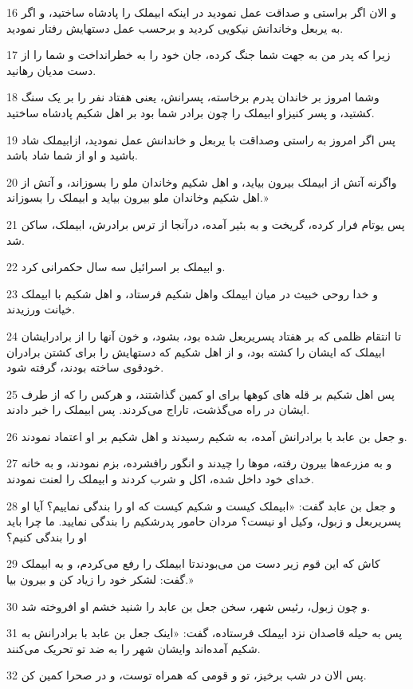 \par 16 و الان اگر براستی و صداقت عمل نمودید در اینکه ابیملک را پادشاه ساختید، و اگر به یربعل وخاندانش نیکویی کردید و برحسب عمل دستهایش رفتار نمودید.
\par 17 زیرا که پدر من به جهت شما جنگ کرده، جان خود را به خطرانداخت و شما را از دست مدیان رهانید.
\par 18 وشما امروز بر خاندان پدرم برخاسته، پسرانش، یعنی هفتاد نفر را بر یک سنگ کشتید، و پسر کنیزاو ابیملک را چون برادر شما بود بر اهل شکیم پادشاه ساختید.
\par 19 پس اگر امروز به راستی وصداقت با یربعل و خاندانش عمل نمودید، ازابیملک شاد باشید و او از شما شاد باشد.
\par 20 واگرنه آتش از ابیملک بیرون بیاید، و اهل شکیم وخاندان ملو را بسوزاند، و آتش از اهل شکیم وخاندان ملو بیرون بیاید و ابیملک را بسوزاند.»
\par 21 پس یوتام فرار کرده، گریخت و به بئیر آمده، درآنجا از ترس برادرش، ابیملک، ساکن شد.
\par 22 و ابیملک بر اسرائیل سه سال حکمرانی کرد.
\par 23 و خدا روحی خبیث در میان ابیملک واهل شکیم فرستاد، و اهل شکیم با ابیملک خیانت ورزیدند.
\par 24 تا انتقام ظلمی که بر هفتاد پسریربعل شده بود، بشود، و خون آنها را از برادرایشان ابیملک که ایشان را کشته بود، و از اهل شکیم که دستهایش را برای کشتن برادران خودقوی ساخته بودند، گرفته شود.
\par 25 پس اهل شکیم بر قله های کوهها برای او کمین گذاشتند، و هرکس را که از طرف ایشان در راه می‌گذشت، تاراج می‌کردند. پس ابیملک را خبر دادند.
\par 26 و جعل بن عابد با برادرانش آمده، به شکیم رسیدند و اهل شکیم بر او اعتماد نمودند.
\par 27 و به مزرعه‌ها بیرون رفته، موها را چیدند و انگور رافشرده، بزم نمودند، و به خانه خدای خود داخل شده، اکل و شرب کردند و ابیملک را لعنت نمودند.
\par 28 و جعل بن عابد گفت: «ابیملک کیست و شکیم کیست که او را بندگی نماییم؟ آیا او پسریربعل و زبول، وکیل او نیست؟ مردان حامور پدرشکیم را بندگی نمایید. ما چرا باید او را بندگی کنیم؟
\par 29 کاش که این قوم زیر دست من می‌بودندتا ابیملک را رفع می‌کردم، و به ابیملک گفت: لشکر خود را زیاد کن و بیرون بیا.»
\par 30 و چون زبول، رئیس شهر، سخن جعل بن عابد را شنید خشم او افروخته شد.
\par 31 پس به حیله قاصدان نزد ابیملک فرستاده، گفت: «اینک جعل بن عابد با برادرانش به شکیم آمده‌اند وایشان شهر را به ضد تو تحریک می‌کنند.
\par 32 پس الان در شب برخیز، تو و قومی که همراه توست، و در صحرا کمین کن.
